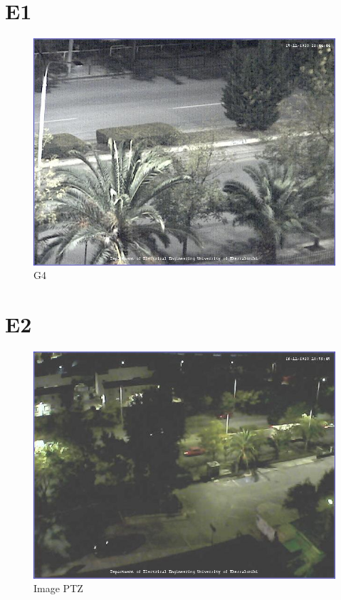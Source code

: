 \documentclass[hidelinks, 12pt, a4paper]{article}
\begin{document}
\section{E1}

\begin{figure}[h!]
\centering
	\includegraphics[height=.4\textheight, width=\textwidth]{assets/session1/image_fix.jpg}
	\caption{G4} 
\end{figure}

\section{E2}

\begin{figure}[h!]
\centering
	\includegraphics[height=.4\textheight, width=\textwidth]{assets/session1/image_ptz.jpg}
	\caption{Image PTZ} 
\end{figure}
\end{document}
